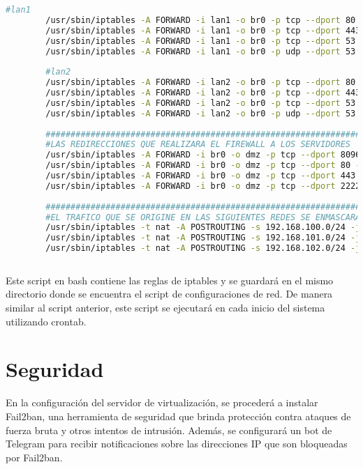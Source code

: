 \begin{lstlisting}[language=Bash, caption=iptables]
		#lan1
		/usr/sbin/iptables -A FORWARD -i lan1 -o br0 -p tcp --dport 80 -j ACCEPT
		/usr/sbin/iptables -A FORWARD -i lan1 -o br0 -p tcp --dport 443 -j ACCEPT
		/usr/sbin/iptables -A FORWARD -i lan1 -o br0 -p tcp --dport 53 -j ACCEPT
		/usr/sbin/iptables -A FORWARD -i lan1 -o br0 -p udp --dport 53 -j ACCEPT
		
		#lan2
		/usr/sbin/iptables -A FORWARD -i lan2 -o br0 -p tcp --dport 80 -j ACCEPT
		/usr/sbin/iptables -A FORWARD -i lan2 -o br0 -p tcp --dport 443 -j ACCEPT
		/usr/sbin/iptables -A FORWARD -i lan2 -o br0 -p tcp --dport 53 -j ACCEPT
		/usr/sbin/iptables -A FORWARD -i lan2 -o br0 -p udp --dport 53 -j ACCEPT
		
		#######################################################################################
		#LAS REDIRECCIONES QUE REALIZARA EL FIREWALL A LOS SERVIDORES
		/usr/sbin/iptables -A FORWARD -i br0 -o dmz -p tcp --dport 8096 -j ACCEPT
		/usr/sbin/iptables -A FORWARD -i br0 -o dmz -p tcp --dport 80 -j ACCEPT
		/usr/sbin/iptables -A FORWARD -i br0 -o dmz -p tcp --dport 443 -j ACCEPT
		/usr/sbin/iptables -A FORWARD -i br0 -o dmz -p tcp --dport 2222 -j ACCEPT
		
		#######################################################################################
		#EL TRAFICO QUE SE ORIGINE EN LAS SIGUIENTES REDES SE ENMASCARA
		/usr/sbin/iptables -t nat -A POSTROUTING -s 192.168.100.0/24 -j MASQUERADE
		/usr/sbin/iptables -t nat -A POSTROUTING -s 192.168.101.0/24 -j MASQUERADE
		/usr/sbin/iptables -t nat -A POSTROUTING -s 192.168.102.0/24 -j MASQUERADE
	
		\end{lstlisting}
		
		
		Este script en bash contiene las reglas de iptables y se guardará en el mismo directorio donde se encuentra el script de configuraciones de red. De manera similar al script anterior, este script se ejecutará en cada inicio del sistema utilizando crontab.\par
		
	
		
		\section{Seguridad}
		
		En la configuración del servidor de virtualización, se procederá a instalar Fail2ban, una herramienta de seguridad que brinda protección contra ataques de fuerza bruta y otros intentos de intrusión. Además, se configurará un bot de Telegram para recibir notificaciones sobre las direcciones IP que son bloqueadas por Fail2ban.
		
